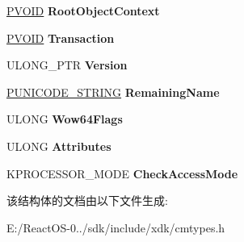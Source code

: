 \begin{DoxyCompactItemize}
\hyperlink{interfacevoid}{P\+V\+O\+ID} {\bfseries Root\+Object\+Context}
\item 
\mbox{\label{struct___r_e_g___c_r_e_a_t_e___k_e_y___i_n_f_o_r_m_a_t_i_o_n___v1_a8217bce4935406646269c6e05ee39e1b}} 
\hyperlink{interfacevoid}{P\+V\+O\+ID} {\bfseries Transaction}
\item 
\mbox{\label{struct___r_e_g___c_r_e_a_t_e___k_e_y___i_n_f_o_r_m_a_t_i_o_n___v1_a92fbf58114cf8121f918109669c5f0a9}} 
U\+L\+O\+N\+G\+\_\+\+P\+TR {\bfseries Version}
\item 
\mbox{\label{struct___r_e_g___c_r_e_a_t_e___k_e_y___i_n_f_o_r_m_a_t_i_o_n___v1_a788e46aa4871769ac763bd4f8fe24088}} 
\hyperlink{struct___u_n_i_c_o_d_e___s_t_r_i_n_g}{P\+U\+N\+I\+C\+O\+D\+E\+\_\+\+S\+T\+R\+I\+NG} {\bfseries Remaining\+Name}
\item 
\mbox{\label{struct___r_e_g___c_r_e_a_t_e___k_e_y___i_n_f_o_r_m_a_t_i_o_n___v1_af7a1d3dd5f15d73c3c124af1d05b202c}} 
U\+L\+O\+NG {\bfseries Wow64\+Flags}
\item 
\mbox{\label{struct___r_e_g___c_r_e_a_t_e___k_e_y___i_n_f_o_r_m_a_t_i_o_n___v1_a4e9bbcf4b66433f6ebf613480e913111}} 
U\+L\+O\+NG {\bfseries Attributes}
\item 
\mbox{\label{struct___r_e_g___c_r_e_a_t_e___k_e_y___i_n_f_o_r_m_a_t_i_o_n___v1_ab53d1b2af6f4fa514d13523ebc1a095b}} 
K\+P\+R\+O\+C\+E\+S\+S\+O\+R\+\_\+\+M\+O\+DE {\bfseries Check\+Access\+Mode}
\end{DoxyCompactItemize}


该结构体的文档由以下文件生成\+:\begin{DoxyCompactItemize}
\item 
E\+:/\+React\+O\+S-\/0../sdk/include/xdk/cmtypes.\+h\end{DoxyCompactItemize}
